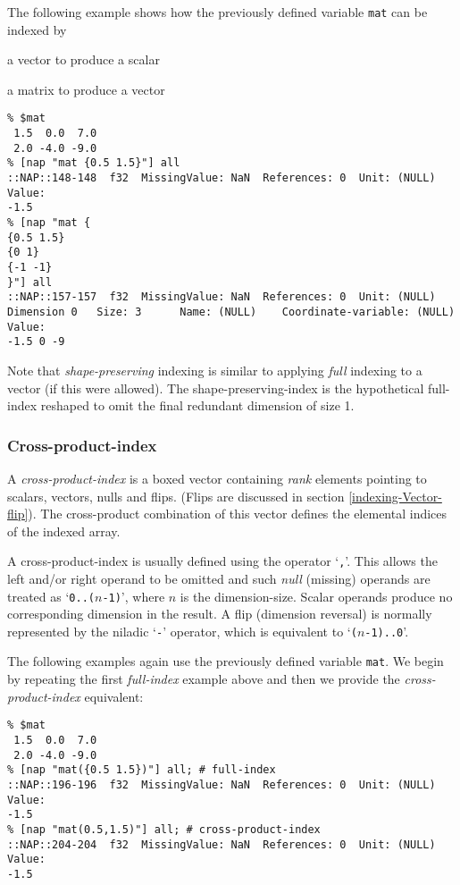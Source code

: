 The following example shows how the previously defined variable 
  \texttt{mat} can be indexed by
\begin{bullets}
    \item a vector to produce a scalar
    \item a matrix to produce a vector
\end{bullets}
  \begin{verbatim}
% $mat
 1.5  0.0  7.0
 2.0 -4.0 -9.0
% [nap "mat {0.5 1.5}"] all
::NAP::148-148  f32  MissingValue: NaN  References: 0  Unit: (NULL)
Value:
-1.5
% [nap "mat {
{0.5 1.5}
{0 1}
{-1 -1}
}"] all
::NAP::157-157  f32  MissingValue: NaN  References: 0  Unit: (NULL)
Dimension 0   Size: 3      Name: (NULL)    Coordinate-variable: (NULL)
Value:
-1.5 0 -9
\end{verbatim}

Note that 
  \emph{shape-preserving} indexing is similar to applying 
  \emph{full} indexing to a vector (if this were allowed). The
  shape-preserving-index is the hypothetical full-index reshaped to
  omit the final redundant dimension of size 1.

\subsubsection{Cross-product-index}
    \label{indexing-Cross-product-index}

A 
  \emph{cross-product-index} is a boxed vector containing 
  \emph{rank} elements pointing to scalars, vectors, nulls and flips.
(Flips are discussed in section \ref{indexing-Vector-flip}).
The cross-product combination of
  this vector defines the elemental indices of the indexed array.
  

A cross-product-index is usually defined using the operator `\texttt{,}'.
    This allows the left and/or right operand to
  be omitted and such 
  \emph{null} (missing) operands are treated as 
  \mbox{`\texttt{0..(}$n$\texttt{-1)}',} where 
  $n$ is the dimension-size. Scalar operands produce no
  corresponding dimension in the result. A flip (dimension reversal) is
  normally represented by the niladic `\texttt{-}' operator,
    which is equivalent to 
  \mbox{`\texttt{(}$n$\texttt{-1)..0}'.}
  

The following examples again use the previously defined variable 
  \texttt{mat}. We begin by repeating the first 
  \emph{full-index} example above and then we provide the 
  \emph{cross-product-index} equivalent:
  \begin{verbatim}
% $mat
 1.5  0.0  7.0
 2.0 -4.0 -9.0
% [nap "mat({0.5 1.5})"] all; # full-index
::NAP::196-196  f32  MissingValue: NaN  References: 0  Unit: (NULL)
Value:
-1.5
% [nap "mat(0.5,1.5)"] all; # cross-product-index
::NAP::204-204  f32  MissingValue: NaN  References: 0  Unit: (NULL)
Value:
-1.5
\end{verbatim}

